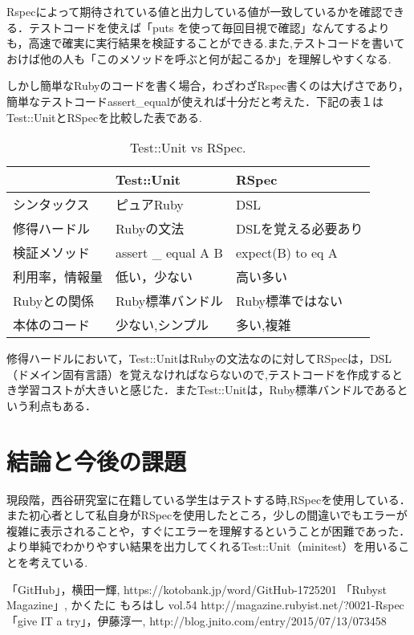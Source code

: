 \documentclass[a4j,twocolumn,uplatex]{jsarticle}
\begin{document}
Rspecによって期待されている値と出力している値が一致しているかを確認できる．テストコードを使えば「puts を使って毎回目視で確認」なんてするよりも，高速で確実に実行結果を検証することができる.また,テストコードを書いておけば他の人も「このメソッドを呼ぶと何が起こるか」を理解しやすくなる.

しかし簡単なRubyのコードを書く場合，わざわざRspec書くのは大げさであり，簡単なテストコードassert\_equalが使えれば十分だと考えた．下記の表１はTest::UnitとRSpecを比較した表である.

\begin{table}[htb]
  \begin{center}
   \caption{Test::Unit vs RSpec.}
   \begin{tabular}{|l||l|l|} \hline
        & Test::Unit  &  RSpec  \\
    \hline \hline
    シンタックス  & ピュアRuby  & DSL \\
    修得ハードル  & Rubyの文法   &  DSLを覚える必要あり\\
    検証メソッド  & assert \_ equal A B  &  expect(B) to eq A \\
    利用率，情報量&低い，少ない&高い多い\\
    Rubyとの関係 & Ruby標準バンドル& Ruby標準ではない\\
    本体のコード&少ない,シンプル&多い,複雑\\
    \hline
  \end{tabular}
  \end{center}
\end{table}

修得ハードルにおいて，Test::UnitはRubyの文法なのに対してRSpecは，DSL（ドメイン固有言語）を覚えなければならないので,テストコードを作成するとき学習コストが大きいと感じた．またTest::Unitは，Ruby標準バンドルであるという利点もある．
\section{結論と今後の課題}
現段階，西谷研究室に在籍している学生はテストする時,RSpecを使用している．
また初心者として私自身がRSpecを使用したところ，少しの間違いでもエラーが複雑に表示されることや，すぐにエラーを理解するということが困難であった．より単純でわかりやすい結果を出力してくれるTest::Unit（minitest）を用いることを考えている\cite{3}.

\begin{thebibliography}{9}
 「GitHub」，横田一輝, https://kotobank.jp/word/GitHub-1725201
 「Rubyst Magazine」, かくたに もろはし vol.54 http://magazine.rubyist.net/?0021-Rspec
 「give IT a try」，伊藤淳一, http://blog.jnito.com/entry/2015/07/13/073458
\end{thebibliography}
\end{document}
